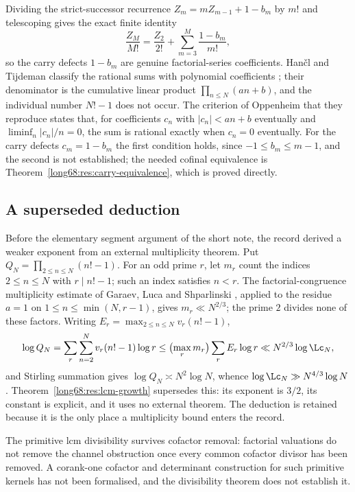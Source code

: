 Dividing the strict-successor recurrence $Z_m=mZ_{m-1}+1-b_m$ by $m!$ and
telescoping gives the exact finite identity
\[
 \frac{Z_M}{M!}=\frac{Z_2}{2!}+\sum_{m=3}^{M}\frac{1-b_m}{m!},
\]
so the carry defects $1-b_m$ are genuine factorial-series coefficients.
Han\v{c}l and Tijdeman classify the rational sums with polynomial coefficients
\cite[Thm.~3.1 and Cor.~3.1, pp.~390--391]{hancl-tijdeman}; their
denominator is the cumulative linear product $\prod_{n\le N}(an+b)$, and the
individual number $N!-1$ does not occur.  The criterion of Oppenheim that they
reproduce \cite[Lem.~2.2, p.~385]{hancl-tijdeman} states that, for
coefficients $c_n$ with $|c_n|<an+b$ eventually and $\liminf_n|c_n|/n=0$, the
sum is rational exactly when $c_n=0$ eventually.  For the carry defects
$c_m=1-b_m$ the first condition holds, since $-1\le b_m\le m-1$, and the
second is not established; the needed cofinal equivalence is
Theorem~\ref{long68:res:carry-equivalence}, which is proved directly.

\subsection{A superseded deduction}\label{long68:sec:ext-superseded}

Before the elementary segment argument of the short note, the record derived
a weaker exponent from an external multiplicity theorem.  Put
$Q_N=\prod_{2\le n\le N}(n!-1)$.  For an odd prime $r$, let $m_r$ count the
indices $2\le n\le N$ with $r\mid n!-1$; such an index satisfies $n<r$.  The
factorial-congruence multiplicity estimate of Garaev, Luca and Shparlinski
\cite[arXiv v1, Thm.~12, p.~16]{garaev-luca-shparlinski}, applied to the
residue $a=1$ on $1\le n\le\min(N,r-1)$, gives $m_r\ll N^{2/3}$; the prime $2$
divides none of
these factors.  Writing $E_r=\max_{2\le n\le N}v_r(n!-1)$,
\[
 \log Q_N=\sum_r\sum_{n=2}^{N}v_r(n!-1)\log r
 \le\bigl(\max_r m_r\bigr)\sum_rE_r\log r
 \ll N^{2/3}\log \Lc_N ,
\]
and Stirling summation gives $\log Q_N\asymp N^2\log N$, whence
$\log \Lc_N\gg N^{4/3}\log N$.  Theorem~\ref{long68:res:lcm-growth} supersedes this:
its exponent is $3/2$, its constant is explicit, and it uses no external
theorem.  The deduction is retained because it is the only place a
multiplicity bound enters the record.

The primitive lcm divisibility survives cofactor removal: factorial
valuations do not remove the channel obstruction once every common cofactor
divisor has been removed.  A corank-one cofactor and determinant construction
for such primitive kernels has not been formalised, and the divisibility
theorem does not establish it.

